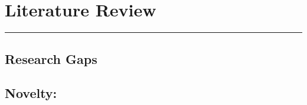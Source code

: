 
\chapter{Literature Review}
\noindent \rule{6.6in}{0.01in}
\newpage



\section{Research Gaps}


\section{Novelty:}

